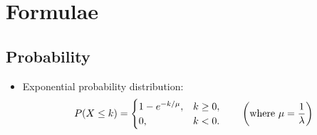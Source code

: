 


\section*{Formulae}

\subsection*{Probability}
\begin{itemize}


\item Exponential probability distribution:
\begin{equation*}
P(X \leq k) = \begin{cases}
1-e^{- k/\mu}, & k \ge 0, \\
0, & k < 0.
\end{cases}\qquad \left( \text{where  }
\mu = {1\over \lambda}\right)
\end{equation*}
\end{itemize}


 
